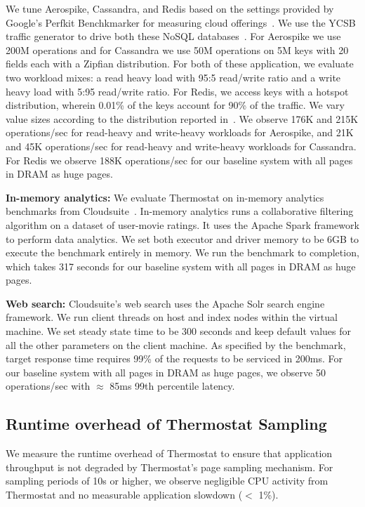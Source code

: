 We tune Aerospike, Cassandra, and Redis based on the settings provided by
Google's Perfkit Benchkmarker for measuring cloud
offerings~\cite{perfkitbenchmarker}.  We use the YCSB traffic generator to drive
both these NoSQL databases~\cite{ycsb}. For Aerospike we use 200M operations
and for Cassandra we use 50M operations on 5M keys with 20 fields each with a
Zipfian distribution.
For both of these application, we evaluate two workload mixes: a read heavy load
with 95:5 read/write ratio and a write heavy load with 5:95 read/write ratio. For Redis, we
access keys with a hotspot distribution, wherein 0.01\% of the keys account for
90\% of the traffic. We vary value sizes according to the
distribution reported in~\cite{facebook-key-value}. We observe 176K
and 215K operations/sec for read-heavy and write-heavy workloads for Aerospike,
and 21K and 45K operations/sec for read-heavy and write-heavy workloads for
Cassandra. For Redis we observe 188K
operations/sec for our baseline system with all pages in
DRAM as huge pages.

{\bf In-memory analytics:} We evaluate Thermostat on in-memory analytics
benchmarks from Cloudsuite~\cite{cloudsuite}. In-memory analytics runs a
collaborative filtering algorithm on a dataset of user-movie ratings.  It uses
the Apache Spark framework to perform data analytics. We set both executor and driver
memory to be 6GB to execute the benchmark entirely in memory. We run the benchmark to
completion, which takes 317 seconds for our baseline system with all pages in
DRAM as huge pages.

{\bf Web search:} Cloudsuite's web search uses the Apache Solr search engine
framework. We run client threads on host and index nodes within the virtual
machine. We set steady state time to be 300 seconds and keep default values for all
the other parameters on the client machine. As specified by the benchmark,
target response time requires 99\% of the requests to be serviced in 200ms. For
our baseline system with all pages in DRAM as huge pages, we observe 50
operations/sec with $\approx$ 85ms 99th percentile latency.

\subsection{Runtime overhead of Thermostat Sampling}
We measure the runtime overhead of Thermostat to ensure that application 
throughput is not degraded by Thermostat's page sampling mechanism.
For sampling periods of 10s or higher, we observe negligible CPU activity
from Thermostat and no measurable application slowdown ($<$ 1\%).


